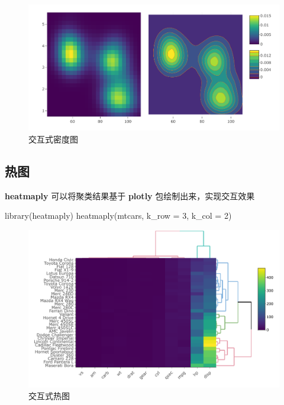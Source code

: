 \documentclass[
  b5paper,
  UTF8,twoside]{book}
\newenvironment{Shaded}{\begin{snugshade}}{\end{snugshade}}
\newcommand{\AttributeTok}[1]{\textcolor[rgb]{0.77,0.63,0.00}{#1}}
\newcommand{\DecValTok}[1]{\textcolor[rgb]{0.00,0.00,0.81}{#1}}
\newcommand{\FunctionTok}[1]{\textcolor[rgb]{0.00,0.00,0.00}{#1}}
\newcommand{\NormalTok}[1]{#1}
\begin{document}
\begin{figure}

{\centering \includegraphics{interactives/plotly-heatmap-contour} 

}

\caption{交互式密度图}\label{fig:plotly-heatmap-contour}
\end{figure}

\hypertarget{subsec:plotly-heatmap}{%
\subsection{热图}\label{subsec:plotly-heatmap}}

\textbf{heatmaply} \citep{heatmaply} 可以将聚类结果基于 \textbf{plotly} 包绘制出来，实现交互效果

\begin{Shaded}
\begin{Highlighting}[]
\FunctionTok{library}\NormalTok{(heatmaply)}
\FunctionTok{heatmaply}\NormalTok{(mtcars, }\AttributeTok{k\_row =} \DecValTok{3}\NormalTok{, }\AttributeTok{k\_col =} \DecValTok{2}\NormalTok{)}
\end{Highlighting}
\end{Shaded}

\begin{figure}

{\centering \includegraphics{interactives/heatmaply} 

}

\caption{交互式热图}\label{fig:heatmaply}
\end{figure}
\end{document}
